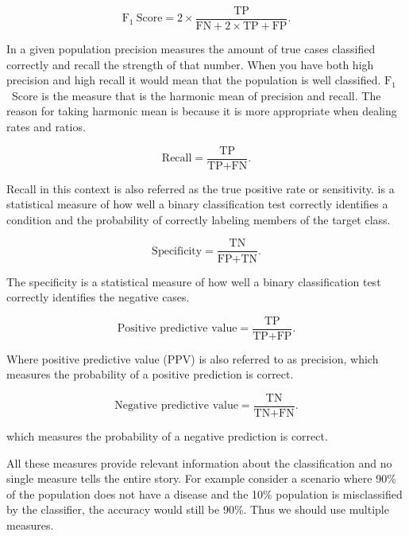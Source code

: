 \documentclass[authoryear,preprint,revi	ew,12pt]{elsarticle}
\newcommand{\F}   {$ \textrm{F}_1 $}
\begin{document}
\begin{equation*}
\textrm{F}_1~\textrm{Score} = 2 \times \frac{\textrm{TP}}{\textrm{FN} + 2\times \textrm{TP} + \textrm{FP}}.
\end{equation*}

In a given population precision measures the amount of true cases classified correctly and recall the strength of that number. When you have both high precision and high recall it would mean that the population is well classified. \F~Score is the measure that is the harmonic mean of precision and recall. The reason for taking harmonic mean is because it is more appropriate when dealing rates and ratios.  

\begin{equation*}
\textrm{Recall} = \frac{\textrm{TP}}{\textrm{TP} + \textrm{FN}}.
\end{equation*}

Recall in this context is also referred as the true positive rate or sensitivity.  is a statistical measure of how well a binary classification test correctly identifies a condition and the probability of correctly labeling members of the target class.

\begin{equation*}
\textrm{Specificity} = \frac{\textrm{TN}}{\textrm{FP} + \textrm{TN}}.
\end{equation*}

The specificity is a statistical measure of how well a binary classification test correctly identifies the negative cases.

\begin{equation*}
\textrm{Positive predictive value} = \frac{\textrm{TP}}{\textrm{TP} + \textrm{FP}}.
\end{equation*}

Where positive predictive value (PPV) is also referred to as precision, which measures the probability of a positive prediction is correct.

\begin{equation*}
\textrm{Negative predictive value} = \frac{\textrm{TN}}{\textrm{TN} + \textrm{FN}}.
\end{equation*}

which measures the probability of a negative prediction is correct.

All these measures provide relevant information about the classification and no single measure tells the entire story. For example consider a scenario where 90\% of the population does not have a disease and the 10\% population is misclassified by the classifier, the accuracy would still be 90\%. Thus we should use multiple measures.   
\end{document}

